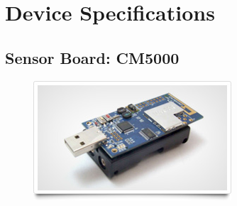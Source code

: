 \section{Device Specifications}
\label{sec:dev-spec}

%
%
%
%
%

\subsection{Sensor Board: CM5000}

\begin{figure}[H]
\centering
\includegraphics[scale=0.5]{Images/CM5000}
\end{figure}


